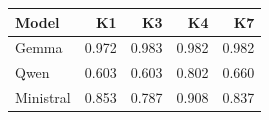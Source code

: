 \begin{tabular}{lrrrr}
\toprule
Model & K1 & K3 & K4 & K7 \\
\midrule
Gemma & 0.972 & 0.983 & 0.982 & 0.982 \\
Qwen & 0.603 & 0.603 & 0.802 & 0.660 \\
Ministral & 0.853 & 0.787 & 0.908 & 0.837 \\
\bottomrule
\end{tabular}
